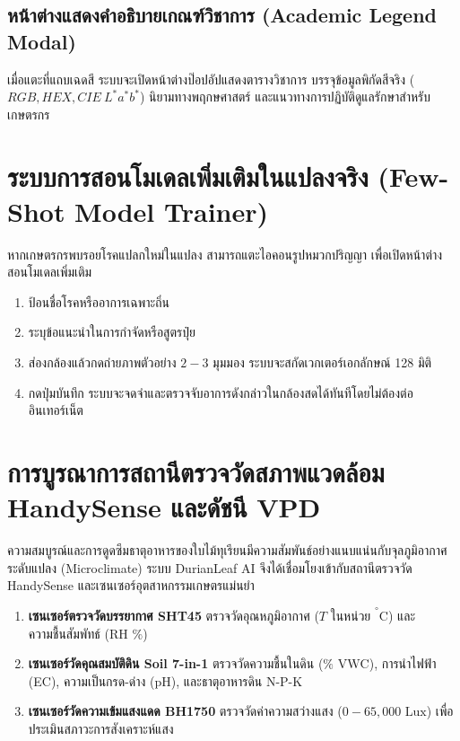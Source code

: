 \subsection{หน้าต่างแสดงคำอธิบายเกณฑ์วิชาการ (Academic Legend Modal)}
เมื่อแตะที่แถบเฉดสี ระบบจะเปิดหน้าต่างป๊อปอัปแสดงตารางวิชาการ บรรจุข้อมูลพิกัดสีจริง ($RGB, HEX, CIE\ L^*a^*b^*$) นิยามทางพฤกษศาสตร์ และแนวทางการปฏิบัติดูแลรักษาสำหรับเกษตรกร

\section{ระบบการสอนโมเดลเพิ่มเติมในแปลงจริง (Few-Shot Model Trainer)}
หากเกษตรกรพบรอยโรคแปลกใหม่ในแปลง สามารถแตะไอคอนรูปหมวกปริญญา เพื่อเปิดหน้าต่างสอนโมเดลเพิ่มเติม
\begin{enumerate}
  \item ป้อนชื่อโรคหรืออาการเฉพาะถิ่น
  \item ระบุข้อแนะนำในการกำจัดหรือสูตรปุ๋ย
  \item ส่องกล้องแล้วกดถ่ายภาพตัวอย่าง $2 - 3$ มุมมอง ระบบจะสกัดเวกเตอร์เอกลักษณ์ 128 มิติ
  \item กดปุ่มบันทึก ระบบจะจดจำและตรวจจับอาการดังกล่าวในกล้องสดได้ทันทีโดยไม่ต้องต่ออินเทอร์เน็ต
\end{enumerate}

\section{การบูรณาการสถานีตรวจวัดสภาพแวดล้อม HandySense และดัชนี VPD}
ความสมบูรณ์และการดูดซึมธาตุอาหารของใบไม้ทุเรียนมีความสัมพันธ์อย่างแนบแน่นกับจุลภูมิอากาศระดับแปลง (Microclimate) ระบบ DurianLeaf AI จึงได้เชื่อมโยงเข้ากับสถานีตรวจวัด HandySense และเซนเซอร์อุตสาหกรรมเกษตรแม่นยำ
\begin{enumerate}
  \item \textbf{เซนเซอร์ตรวจวัดบรรยากาศ SHT45} ตรวจวัดอุณหภูมิอากาศ ($T \text{ ในหน่วย } ^\circ\text{C}$) และความชื้นสัมพัทธ์ ($\text{RH } \%$)
  \item \textbf{เซนเซอร์วัดคุณสมบัติดิน Soil 7-in-1} ตรวจวัดความชื้นในดิน ($\% \text{ VWC}$), การนำไฟฟ้า (EC), ความเป็นกรด-ด่าง (pH), และธาตุอาหารดิน N-P-K
  \item \textbf{เซนเซอร์วัดความเข้มแสงแดด BH1750} ตรวจวัดค่าความสว่างแสง ($0 - 65,000 \text{ Lux}$) เพื่อประเมินสภาวะการสังเคราะห์แสง
\end{enumerate}

